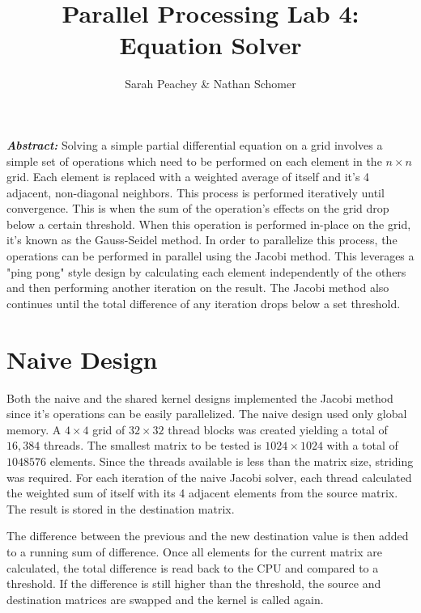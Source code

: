 \documentclass[12pt]{article}
\begin{document}
\title{Parallel Processing Lab 4: \\Equation Solver}
\author{Sarah Peachey \& Nathan Schomer}
\maketitle


\textbf{\textit{Abstract:}} Solving a simple partial
differential equation on a grid involves a simple set 
of operations which need to be performed on each element
in the $n \times n$ grid. Each element is replaced
with a weighted 
average of itself and it's 4 adjacent, non-diagonal 
neighbors. This process is performed iteratively 
until convergence. This is when
the sum of the operation's effects on the grid 
drop below a certain threshold.
When this operation is performed in-place
on the grid, it's known as the Gauss-Seidel method.
In order to parallelize this process, the operations
can be performed in parallel using the Jacobi method.
This leverages a "ping pong" style design by calculating
each element independently of the others and then performing
another iteration on the result. The Jacobi method also
continues until the total difference of any iteration 
drops below a set threshold.



\newpage
\vspace{-1.5cm}
\section{Naive Design}
\vspace{-0.25cm}

Both the naive and the shared kernel designs implemented the Jacobi 
method since it's operations can be easily parallelized. The naive
design used only global memory. A $4 \times 4$ grid of $32 \times 32$
thread blocks was created yielding a total of $16,384$ threads. 
The smallest matrix to be tested is $1024 \times 1024$ with a total
of $1048576$ elements. Since the threads available is less than 
the matrix size, striding was required. For each iteration of the 
naive Jacobi solver, each thread calculated the weighted sum of itself
with its 4 adjacent elements from the source matrix. 
The result is stored in the destination matrix.


The difference between the previous and the new destination value 
is then added to a running sum of difference. Once all elements for
the current matrix are calculated, the total difference is read back
to the CPU and compared to a threshold. If the difference is still higher
than the threshold, the source and destination matrices are swapped
and the kernel is called again.
\end{document}
